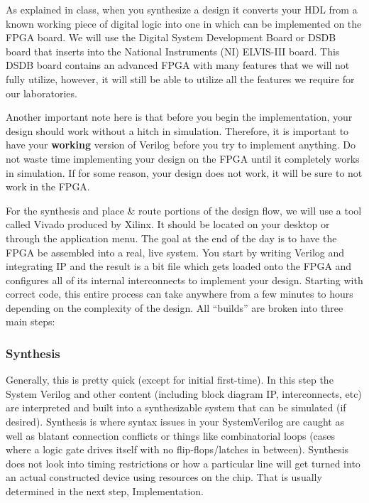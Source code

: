 \documentclass{article}
\begin{document}
As explained in class, when you synthesize a design it converts your
HDL from a known working piece of digital logic into one in which can
be implemented on the FPGA board.  We will use the Digital System
Development Board or DSDB board that inserts into the National
Instruments (NI) ELVIS-III
board.  This DSDB board contains an advanced FPGA with many
features that we will not fully utilize, however, it will still be able to
utilize all the features we require for our laboratories.

Another important note here is that before you begin the
implementation, your design should work without a hitch in
simulation.  Therefore, it is important to have your \textbf{working}
version of Verilog before you try to implement anything.  Do not waste
time implementing your design on the FPGA until it completely works in
simulation.  If for some
reason, your design does not work, it will be sure to not work in the FPGA.

For the synthesis and place \& route portions of the design flow, we
will use a tool called Vivado produced by Xilinx.  It should be
located on your desktop or through the application menu.  The goal at
the end of the day is to have the FPGA be assembled into a real, live
system. You start by writing Verilog and integrating IP and the result
is a bit file which gets loaded onto the FPGA and configures all of
its internal interconnects to implement your design. Starting with
correct code, this entire process can take anywhere from a few minutes
to hours depending on the complexity of the design. All “builds” are
broken into three main steps:

\subsubsection{Synthesis}

Generally, this is pretty quick (except for initial first-time). In
this step the System Verilog and other content (including block
diagram IP, interconnects, etc) are interpreted and built into a
synthesizable system that can be simulated (if desired). Synthesis is
where syntax issues in your SystemVerilog are caught as well as
blatant connection conflicts or things like combinatorial loops (cases
where a logic gate drives itself with no flip-flops/latches in
between). Synthesis does not look into timing restrictions or how a
particular line will get turned into an actual constructed device
using resources on the chip. That is usually determined in the next
step, Implementation.
\end{document}
